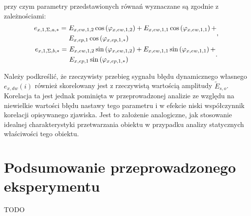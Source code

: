 przy czym parametry przedstawionych równań wyznaczane są zgodnie z zależnościami:
\begin{gather}
\begin{split}
e_{x,1,\Sigma,a,*} =~ & E_{x,ew,1,2} \cos \left(\varphi_{x,ew,1,2}\right) + E_{x,ew,1,1} \cos \left(\varphi_{x,ew,1,1}\right) + \\ & E_{x,ep,1} \cos \left(\varphi_{x,ep,1,*}\right)
\end{split}
\label{eq:pom_mono_dyn_sum_param_a_mid}, \\
\begin{split}
e_{x,1,\Sigma,b,*} =~ & E_{x,ew,1,2} \sin \left(\varphi_{x,ew,1,2}\right) + E_{x,ew,1,1} \sin \left(\varphi_{x,ew,1,1}\right) + \\ & E_{x,ep,1} \sin \left(\varphi_{x,ep,1,*}\right)
\end{split}
\label{eq:pom_mono_dyn_sum_param_b_mid}.
\end{gather}

Należy podkreślić, że rzeczywisty przebieg sygnału błędu dynamicznego własnego $e_{x,dw}(i)$ również skorelowany jest z rzeczywistą wartością amplitudy $\tilde{E}_{s,o}$. Korelacja ta jest jednak pominięta w przeprowadzonej analizie ze względu na niewielkie wartości błędu nastawy tego parametru i w efekcie niski współczynnik korelacji opisywanego zjawiska. Jest to założenie analogiczne, jak stosowanie idealnej charakterystyki przetwarzania obiektu w przypadku analizy statycznych właściwości tego obiektu.



\section{Podsumowanie przeprowadzonego eksperymentu}

TODO

